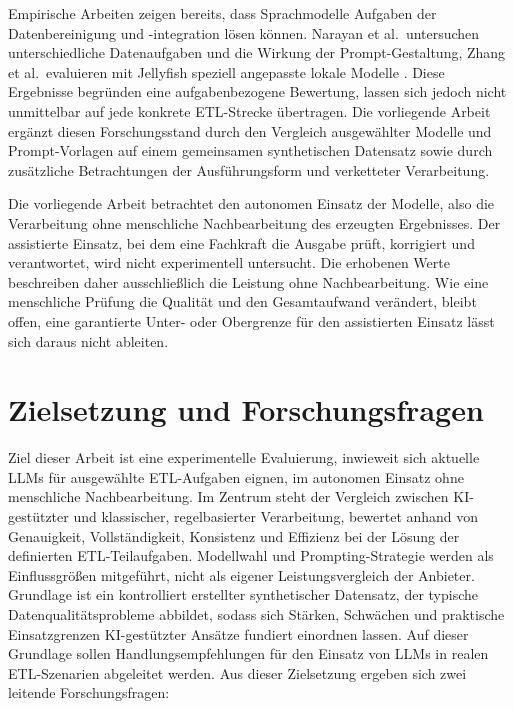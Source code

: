 Empirische Arbeiten zeigen bereits, dass Sprachmodelle Aufgaben der Datenbereinigung und -integration lösen können. Narayan et al.\ untersuchen unterschiedliche Datenaufgaben und die Wirkung der Prompt-Gestaltung, Zhang et al.\ evaluieren mit Jellyfish speziell angepasste lokale Modelle \autocite{narayanFoundationModelsWrangle2022,zhangJellyfish2024}. Diese Ergebnisse begründen eine aufgabenbezogene Bewertung, lassen sich jedoch nicht unmittelbar auf jede konkrete \ac{ETL}-Strecke übertragen. Die vorliegende Arbeit ergänzt diesen Forschungsstand durch den Vergleich ausgewählter Modelle und Prompt-Vorlagen auf einem gemeinsamen synthetischen Datensatz sowie durch zusätzliche Betrachtungen der Ausführungsform und verketteter Verarbeitung.

Die vorliegende Arbeit betrachtet den autonomen Einsatz der Modelle, also die Verarbeitung ohne menschliche Nachbearbeitung des erzeugten Ergebnisses. Der assistierte Einsatz, bei dem eine Fachkraft die Ausgabe prüft, korrigiert und verantwortet, wird nicht experimentell untersucht. Die erhobenen Werte beschreiben daher ausschließlich die Leistung ohne Nachbearbeitung. Wie eine menschliche Prüfung die Qualität und den Gesamtaufwand verändert, bleibt offen, eine garantierte Unter- oder Obergrenze für den assistierten Einsatz lässt sich daraus nicht ableiten.

\section{Zielsetzung und Forschungsfragen}
\label{subsec:zielsetzung}

Ziel dieser Arbeit ist eine experimentelle Evaluierung, inwieweit sich aktuelle \acp{LLM} für ausgewählte \ac{ETL}-Aufgaben eignen, im autonomen Einsatz ohne menschliche Nachbearbeitung. Im Zentrum steht der Vergleich zwischen \ac{KI}-gestützter und klassischer, regelbasierter Verarbeitung, bewertet anhand von Genauigkeit, Vollständigkeit, Konsistenz und Effizienz bei der Lösung der definierten \ac{ETL}-Teilaufgaben. Modellwahl und Prompting-Strategie werden als Einflussgrößen mitgeführt, nicht als eigener Leistungsvergleich der Anbieter. Grundlage ist ein kontrolliert erstellter synthetischer Datensatz, der typische Datenqualitätsprobleme abbildet, sodass sich Stärken, Schwächen und praktische Einsatzgrenzen \ac{KI}-gestützter Ansätze fundiert einordnen lassen. Auf dieser Grundlage sollen Handlungsempfehlungen für den Einsatz von \acp{LLM} in realen \ac{ETL}-Szenarien abgeleitet werden.
Aus dieser Zielsetzung ergeben sich zwei leitende Forschungsfragen:

